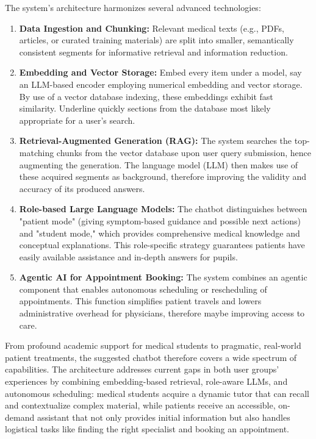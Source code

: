 \noindent The system’s architecture harmonizes several advanced technologies:
\begin{enumerate}[itemsep=2em]
    \item \textbf{Data Ingestion and Chunking:} Relevant medical texts (e.g., PDFs, articles, or curated training materials) are split into smaller, semantically consistent segments for informative retrieval and information reduction.
    
    \item \textbf{Embedding and Vector Storage:} Embed every item under a model, say an LLM-based encoder employing numerical embedding and vector storage. By use of a vector database indexing, these embeddings exhibit fast similarity. Underline quickly sections from the database most likely appropriate for a user's search.
    
    \item \textbf{Retrieval-Augmented Generation (RAG):} The system searches the top-matching chunks from the vector database upon user query submission, hence augmenting the generation. The language model (LLM) then makes use of these acquired segments as background, therefore improving the validity and accuracy of its produced answers.
    
    \item \textbf{Role-based Large Language Models:} The chatbot distinguishes between "patient mode" (giving symptom-based guidance and possible next actions) and "student mode," which provides comprehensive medical knowledge and conceptual explanations. This role-specific strategy guarantees patients have easily available assistance and in-depth answers for pupils.
    
    \item \textbf{Agentic AI for Appointment Booking:} The system combines an agentic component that enables autonomous scheduling or rescheduling of appointments. This function simplifies patient travels and lowers administrative overhead for physicians, therefore maybe improving access to care.
\end{enumerate}




\noindent From profound academic support for medical students to pragmatic, real-world patient treatments, the suggested chatbot therefore covers a wide spectrum of capabilities. The architecture addresses current gaps in both user groups' experiences by combining embedding-based retrieval, role-aware LLMs, and autonomous scheduling: medical students acquire a dynamic tutor that can recall and contextualize complex material, while patients receive an accessible, on-demand assistant that not only provides initial information but also handles logistical tasks like finding the right specialist and booking an appointment.

